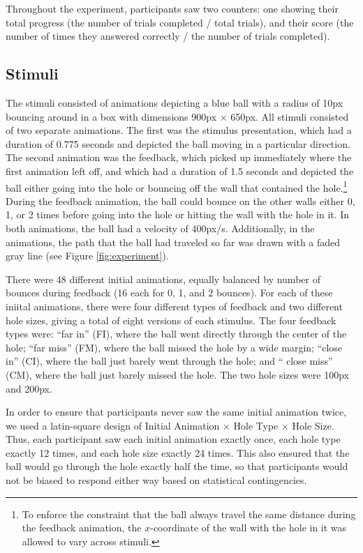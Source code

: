 \documentclass[10pt,letterpaper]{article}
\begin{document}
Throughout the experiment, participants saw two counters: one showing their total progress (the number of trials completed / total trials), and their score (the number of times they answered correctly / the number of trials completed).

\subsection{Stimuli}

The stimuli consisted of animations depicting a blue ball with a radius of 10px bouncing around in a box with dimensions 900px $\times$ 650px. All stimuli consisted of two separate animations. The first was the stimulus presentation, which had a duration of 0.775 seconds and depicted the ball moving in a particular direction. The second animation was the feedback, which picked up immediately where the first animation left off, and which had a duration of 1.5 seconds and depicted the ball either going into the hole or bouncing off the wall that contained the hole.\footnote{To enforce the constraint that the ball always travel the same distance during the feedback animation, the $x$-coordinate of the wall with the hole in it was allowed to vary across stimuli.} During the feedback animation, the ball could bounce on the other walls either 0, 1, or 2 times before going into the hole or hitting the wall with the hole in it. In both animations, the ball had a velocity of 400px/s. Additionally, in the animations, the path that the ball had traveled so far was drawn with a faded gray line (see Figure \ref{fig:experiment}).

There were 48 different initial animations, equally balanced by number of bounces during feedback (16 each for 0, 1, and 2 bounces). For each of these iniital animations, there were four different types of feedback and two different hole sizes, giving a total of eight versions of each stimulus. The four feedback types were: ``far in'' (FI), where the ball went directly through the center of the hole; ``far miss'' (FM), where the ball missed the hole by a wide margin; ``close in'' (CI), where the ball just barely went through the hole; and `` close miss'' (CM), where the ball just barely missed the hole. The two hole sizes were 100px and 200px.

In order to ensure that participants never saw the same initial animation twice, we used a latin-square design of Initial Animation $\times$ Hole Type $\times$ Hole Size. Thus, each participant saw each initial animation exactly once, each hole type exactly 12 times, and each hole size exactly 24 times. This also ensured that the ball would go through the hole exactly half the time, so that participants would not be biased to respond either way based on statistical contingencies.
\end{document}
